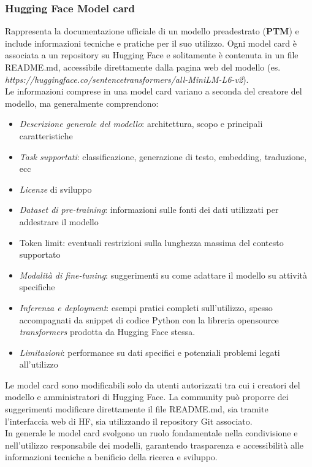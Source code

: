 \documentclass{article}
\begin{document}
\subsubsection{Hugging Face Model card} 
Rappresenta la documentazione ufficiale di un modello preadestrato (\textbf{PTM})  e include informazioni tecniche e pratiche per il suo utilizzo. Ogni model card è associata a un repository su Hugging Face e solitamente è contenuta in un file README.md, accessibile direttamente dalla pagina web del modello (es. \textit{https://huggingface.co/sentencetransformers/all-MiniLM-L6-v2}).\\
Le informazioni comprese in una model card variano a seconda del creatore del modello, ma generalmente comprendono:
\begin{itemize}
    \item \textit{Descrizione generale del modello}: architettura, scopo e principali caratteristiche
    \item \textit{Task supportati}: classificazione, generazione di testo, embedding, traduzione, ecc
    \item \textit{Licenze} di sviluppo
    \item \textit{Dataset di pre-training}: informazioni sulle fonti dei dati utilizzati per addestrare il modello
    \item {Token limit}: eventuali restrizioni sulla lunghezza massima del contesto supportato
    \item \textit{Modalità di fine-tuning}: suggerimenti su come adattare il modello su attività specifiche
    \item \textit{Inferenza e deployment}: esempi pratici completi sull'utilizzo, spesso accompagnati da snippet di codice Python con la libreria opensource \textit{transformers} prodotta da Hugging Face stessa.
    \item \textit{Limitazioni}: performance su dati specifici e potenziali problemi legati all’utilizzo
\end{itemize}
Le model card sono modificabili solo da utenti autorizzati tra cui i creatori del modello e amministratori di Hugging Face. La community può proporre dei suggerimenti modificare direttamente il file README.md, sia tramite l’interfaccia web di HF, sia utilizzando il repository Git associato.\\
In generale le model card svolgono un ruolo fondamentale nella condivisione e nell’utilizzo responsabile dei modelli, garantendo trasparenza e accessibilità alle informazioni tecniche a benificio della ricerca e sviluppo.
\end{document}

